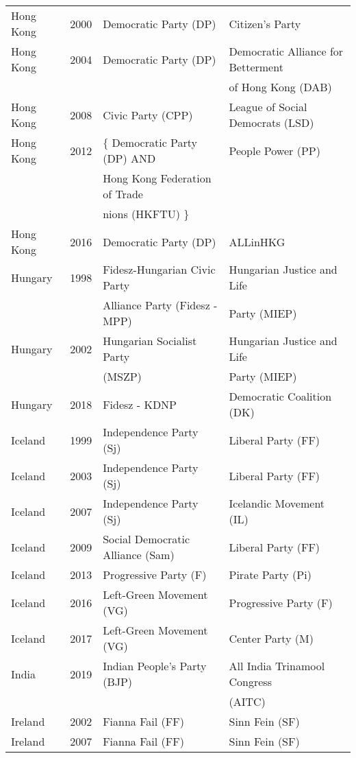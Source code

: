 {\begin{longtable}{|l|c|l|l|}
  Hong Kong & 2000 &   Democratic Party (DP) &   Citizen's Party \\ 
  Hong Kong & 2004 &   Democratic Party (DP) &   Democratic Alliance for Betterment  \\ 
        &    &     &     of Hong Kong (DAB) \\ 
  Hong Kong & 2008 &   Civic Party (CPP) &   League of Social Democrats (LSD) \\ 
  Hong Kong & 2012 &  $\{$ Democratic Party (DP) AND   &   People Power (PP) \\ 
       &    &    Hong Kong Federation of Trade  &     \\ 
       &    &     nions (HKFTU) $\}$ &     \\ 
  Hong Kong & 2016 &   Democratic Party (DP) &   ALLinHKG   \\ 
  Hungary & 1998 &   Fidesz-Hungarian Civic Party  &   Hungarian Justice and Life   \\ 
   &   &   Alliance Party (Fidesz - MPP) &     Party (MIEP) \\ 
  Hungary & 2002 &   Hungarian Socialist Party   &   Hungarian Justice and Life  \\ 
           &   &   (MSZP) &    Party (MIEP) \\ 
  Hungary & 2018 &   Fidesz - KDNP   &   Democratic Coalition (DK) \\ 
  Iceland & 1999 &   Independence Party (Sj) &   Liberal Party (FF) \\ 
  Iceland & 2003 &   Independence Party (Sj) &   Liberal Party (FF) \\ 
  Iceland & 2007 &   Independence Party (Sj) &   Icelandic Movement (IL) \\ 
Iceland & 2009 &        Social Democratic Alliance (Sam)    &   Liberal Party (FF) \\ 
Iceland & 2013 &   Progressive Party (F) &   Pirate Party (Pi) \\ 
Iceland & 2016 &   Left-Green Movement (VG) &   Progressive Party (F) \\ 
Iceland & 2017 &   Left-Green Movement (VG) &   Center Party (M) \\ 
India & 2019 &  Indian People's Party (BJP)   &  All India Trinamool Congress   \\ 
          & &      &    (AITC) \\ 
Ireland & 2002 &   Fianna Fail (FF) &   Sinn Fein (SF) \\ 
Ireland & 2007 &   Fianna Fail (FF) &   Sinn Fein (SF) \\ 

\end{longtable}}
